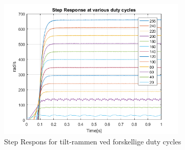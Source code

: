 \begin{figure}[!ht]
	\begin{center}
		\includegraphics[width=0.8\textwidth]{Billeder/RPM_vs_DC.png}
	\end{center}
	\caption{Step Respons for tilt-rammen ved forskellige duty cycles}
	\label{fig:RPM_DC}
\end{figure}